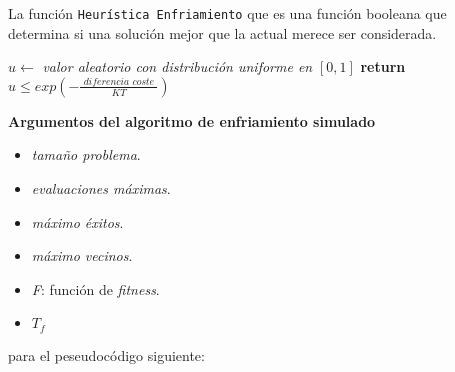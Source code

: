 \newpage
La función \texttt{Heurística Enfriamiento} 
que es una función booleana que determina si una solución mejor que la actual merece ser considerada. 

\begin{algorithm}[H]
  \begin{algorithmic}
      \State $u \gets$ \textit{valor aleatorio con distribución uniforme en }$[0,1]$ 
      \State \textbf{return } 
      $u \leq exp( -\frac{\textit{ diferencia coste }}{K T})$
    \EndProcedure
  \end{algorithmic}  
\end{algorithm} 


\textbf{Argumentos del algoritmo de enfriamiento simulado}
\begin{itemize}
  \item \textit{tamaño problema}.
  \item \textit{evaluaciones máximas}.
  \item \textit{máximo éxitos}.
  \item \textit{máximo vecinos}. 
  \item \textit{F}: función de \textit{fitness}.
  \item $T_f$
\end{itemize}
para el peseudocódigo siguiente: 
\newpage

